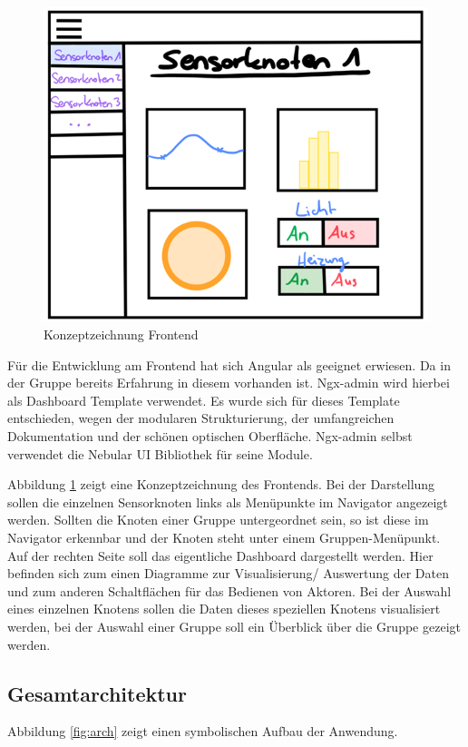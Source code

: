 \documentclass[letterpaper, 10 pt, conference]{ieeeconf}  %
\begin{document}
\begin{figure}[thpb]
      \centering
      \includegraphics[scale=0.55]{abbildungen/frontend.png}
      \caption{Konzeptzeichnung Frontend}
      \label{fig:frontend}
 \end{figure}
 
Für die Entwicklung am Frontend hat sich Angular als geeignet erwiesen. Da in der Gruppe bereits Erfahrung in diesem vorhanden ist. 
Ngx-admin wird hierbei als Dashboard Template verwendet. 
Es wurde sich für dieses Template entschieden, wegen der modularen Strukturierung, der umfangreichen Dokumentation und der schönen optischen Oberfläche. 
Ngx-admin selbst verwendet die Nebular UI Bibliothek für seine Module.

Abbildung \ref{fig:frontend} zeigt eine Konzeptzeichnung des Frontends. 
Bei der Darstellung sollen die einzelnen Sensorknoten links als Menüpunkte im Navigator angezeigt werden. 
Sollten die Knoten einer Gruppe untergeordnet sein, so ist diese im Navigator erkennbar und der Knoten steht unter einem Gruppen-Menüpunkt. 
Auf der rechten Seite soll das eigentliche Dashboard dargestellt werden. 
Hier befinden sich zum einen Diagramme zur Visualisierung/ Auswertung der Daten und zum anderen Schaltflächen für das Bedienen von Aktoren. 
Bei der Auswahl eines einzelnen Knotens sollen die Daten dieses speziellen Knotens visualisiert werden, bei der Auswahl einer Gruppe soll ein Überblick über die Gruppe gezeigt werden.




\subsection{Gesamtarchitektur}
Abbildung \ref{fig:arch} zeigt einen symbolischen Aufbau der Anwendung.
\end{document}
